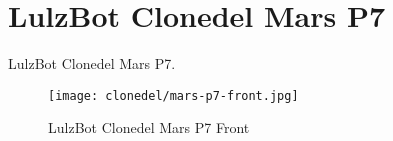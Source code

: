 %
%
%
%
%

\section{LulzBot Clonedel Mars P7}
LulzBot Clonedel Mars P7.

\begin{figure}[h!]
\texttt{[image: clonedel/mars-p7-front.jpg]}
 \caption{LulzBot Clonedel Mars P7 Front}
 \label{fig:clonedel-mars-p7-front}
\end{figure}


